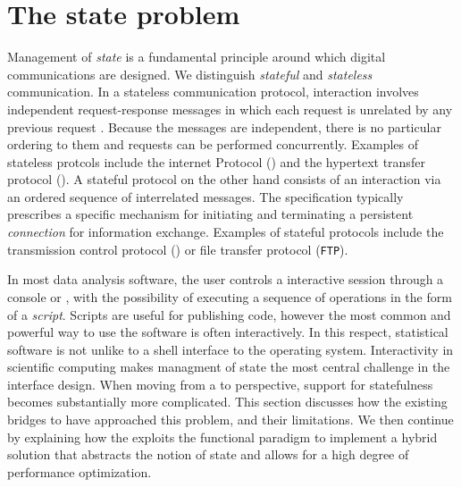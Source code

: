 \section{The state problem}

Management of \emph{state} is a fundamental principle around which digital communications are designed. We distinguish \emph{stateful} and \emph{stateless} communication. In a stateless communication protocol, interaction involves independent request-response messages in which each request is unrelated by any previous request \citep{hennessy2012computer}. Because the messages are independent, there is no particular ordering to them and requests can be performed concurrently. Examples of stateless protcols include the internet Protocol (\IP) and the hypertext transfer protocol (\HTTP). A stateful protocol on the other hand consists of an interaction via an ordered sequence of interrelated messages. The specification typically prescribes a specific mechanism for initiating and terminating a persistent \emph{connection} for information exchange. Examples of stateful protocols include the transmission control protocol (\TCP) or file transfer protocol (\texttt{FTP}).


In most data analysis software, the user controls a interactive session through a console or \GUI, with the possibility of executing a sequence of operations in the form of a \emph{script}. Scripts are useful for publishing code, however the most common and powerful way to use the software is often interactively. In this respect, statistical software is not unlike to a shell interface to the operating system. Interactivity in scientific computing makes managment of state the most central challenge in the interface design. When moving from a \UI to \API perspective, support for statefulness becomes substantially more complicated. This section discusses how the existing bridges to \R have approached this problem, and their limitations. We then continue by explaining how the \OpenCPU \API exploits the functional paradigm to implement a hybrid solution that abstracts the notion of state and allows for a high degree of performance optimization.

